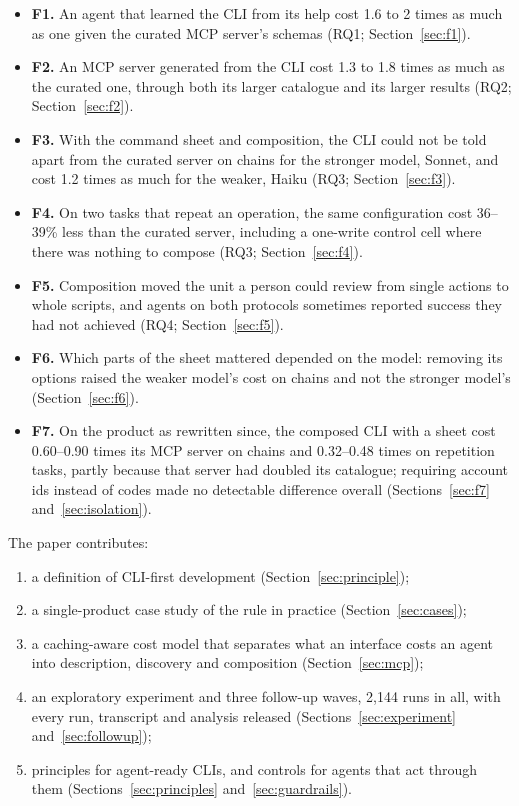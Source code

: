 \documentclass[sigconf,nonacm]{acmart}
\newcommand{\finding}[1]{\textbf{#1}}
\begin{document}
\begin{itemize}
\item \finding{F1.} An agent that learned the CLI from its help cost 1.6 to 2 times as much as one given the curated MCP server's schemas (RQ1; Section~\ref{sec:f1}).
\item \finding{F2.} An MCP server generated from the CLI cost 1.3 to 1.8 times as much as the curated one, through both its larger catalogue and its larger results (RQ2; Section~\ref{sec:f2}).
\item \finding{F3.} With the command sheet and composition, the CLI could not be told apart from the curated server on chains for the stronger model, Sonnet, and cost 1.2 times as much for the weaker, Haiku (RQ3; Section~\ref{sec:f3}).
\item \finding{F4.} On two tasks that repeat an operation, the same configuration cost 36--39\% less than the curated server, including a one-write control cell where there was nothing to compose (RQ3; Section~\ref{sec:f4}).
\item \finding{F5.} Composition moved the unit a person could review from single actions to whole scripts, and agents on both protocols sometimes reported success they had not achieved (RQ4; Section~\ref{sec:f5}).
\item \finding{F6.} Which parts of the sheet mattered depended on the model: removing its options raised the weaker model's cost on chains and not the stronger model's (Section~\ref{sec:f6}).
\item \finding{F7.} On the product as rewritten since, the composed CLI with a sheet cost 0.60--0.90 times its MCP server on chains and 0.32--0.48 times on repetition tasks, partly because that server had doubled its catalogue; requiring account ids instead of codes made no detectable difference overall (Sections~\ref{sec:f7} and~\ref{sec:isolation}).
\end{itemize}

\noindent The paper contributes:
\begin{enumerate}
\item a definition of CLI-first development (Section~\ref{sec:principle});
\item a single-product case study of the rule in practice (Section~\ref{sec:cases});
\item a caching-aware cost model that separates what an interface costs an agent into description, discovery and composition (Section~\ref{sec:mcp});
\item an exploratory experiment and three follow-up waves, 2{,}144 runs in all, with every run, transcript and analysis released (Sections~\ref{sec:experiment} and~\ref{sec:followup});
\item principles for agent-ready CLIs, and controls for agents that act through them (Sections~\ref{sec:principles} and~\ref{sec:guardrails}).
\end{enumerate}
\end{document}
